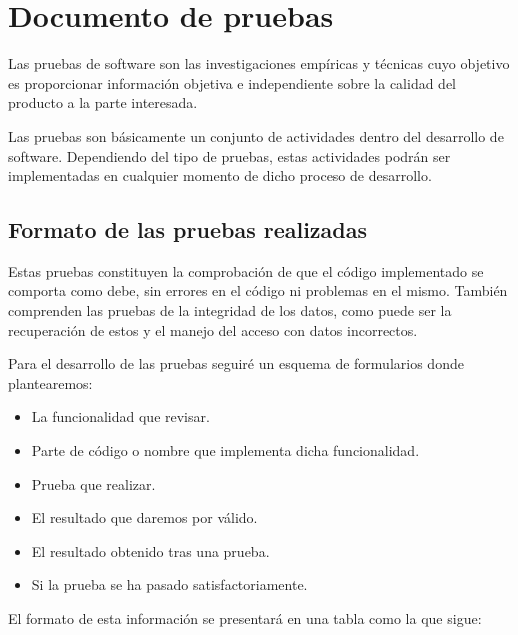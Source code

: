\chapter{Documento de pruebas}\label{cap:documento pruebas}

Las pruebas de software son las investigaciones empíricas y técnicas cuyo objetivo es proporcionar información objetiva e independiente sobre la calidad del producto a la parte interesada.

Las pruebas son básicamente un conjunto de actividades dentro del desarrollo de software. Dependiendo del tipo de pruebas, estas actividades podrán ser implementadas en cualquier momento de dicho proceso de desarrollo.

\section{Formato de las pruebas realizadas}

Estas pruebas constituyen la comprobación de que el código implementado se comporta como debe, sin errores en el código ni problemas en el mismo. También comprenden las pruebas de la integridad de los datos, como puede ser la recuperación de estos y el manejo del acceso con datos incorrectos.

Para el desarrollo de las pruebas seguiré un esquema de formularios donde plantearemos:

\begin{itemize}
    \item La funcionalidad que revisar.
    \item Parte de código o nombre que implementa dicha funcionalidad.
    \item Prueba que realizar.
    \item El resultado que daremos por válido.
    \item El resultado obtenido tras una prueba.
    \item Si la prueba se ha pasado satisfactoriamente.
\end{itemize}

\bigskip

El formato de esta información se presentará en una tabla como la que sigue:

\bigskip

